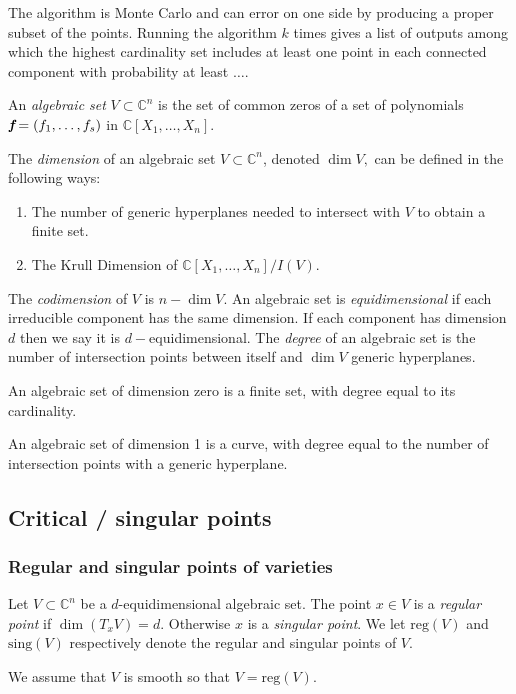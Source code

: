 \documentclass[sigconf]{acmart}
\def\C{\mathbb{C}}
\def\sing{ \textrm{sing}}
\def\reg{\textrm{reg}}
\begin{document}
The algorithm is Monte Carlo and can error on one side by producing a
proper subset of the points. Running the algorithm $k$ times gives a
list of outputs among which the highest cardinality set includes at
least one point in each connected component with probability at least
$\hdots.$



An \textit{algebraic set} $V \subset \C^n$ is the set of common zeros of a set of polynomials $\textit{\textbf{f}}=(f_1,\hdots,f_s)$ in $\C[X_1,\hdots,X_n].$

The \textit{dimension} of an algebraic set $V \subset \C^n$, denoted $\dim V,$ can be defined in the following ways:
%
\begin{enumerate}
    \item The number of generic hyperplanes needed to intersect with $V$ to obtain a finite set. 
    \item The Krull Dimension of $\C[X_1,\hdots,X_n]/I(V)$.
\end{enumerate}
%
The \textit{codimension} of $V$ is $n - \dim V$. An algebraic set is \textit{equidimensional} if each irreducible component has the same dimension.  If each component has dimension $d$ then we say it is $d-$equidimensional. 
The \textit{degree} of an algebraic set is the number of intersection points between itself and $\dim V$ generic hyperplanes.
%
\begin{example} 
An algebraic set of dimension zero is a finite set, with degree equal to its cardinality.
\end{example}
%
\begin{example}
An algebraic set of dimension 1 is a curve, with degree equal to the number of intersection points with a generic hyperplane.
\end{example}
%
%
%
\subsection{Critical / singular points}
%
\subsubsection{Regular and singular points of varieties}
%
Let $V \subset \C^n$ be a $d$-equidimensional algebraic set. 
The point $x \in V$ is a \textit{regular point} if $\dim (T_xV) = d.$ Otherwise $x$ is a \textit{singular point}. We let $\reg(V)$ and $\sing(V)$ respectively denote the regular and singular points of $V$. 
\par 
We assume that $V$ is smooth so that $V=\reg(V).$
%
\end{document}
